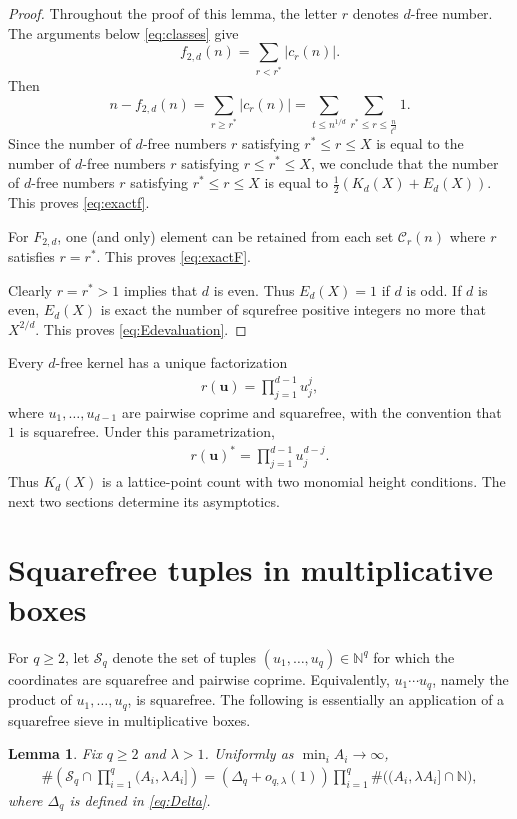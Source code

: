 \documentclass[12pt,a4paper,reqno]{amsart}
\numberwithin{equation}{section}
\newcommand{\N}{\mathbb N}
\newcommand{\cC}{\mathcal C}
\newcommand{\1}{\mathbf 1}
\newcommand{\bsu}{\boldsymbol u}
\theoremstyle{plain}
\newtheorem{lemma}[theorem]{Lemma}
\theoremstyle{definition}
\begin{document}
\begin{proof}Throughout the proof of this lemma, the letter $r$ denotes $d$-free number. The arguments below \eqref{eq:classes} give
$$f_{2,d}(n)=\sum_{r< r^\ast}|c_r(n)|.$$
Then 
$$n-f_{2,d}(n)=\sum_{r\geq r^\ast}|c_r(n)|=\sum_{t\leq n^{1/d}}\sum_{r^\ast\leq r\leq \frac{n}{t^d}}1.$$
Since the number of $d$-free numbers $r$ satisfying $r^\ast\leq r\leq X$ is equal to the number of $d$-free numbers $r$ satisfying $r\leq r^\ast\leq X$, we conclude that
the number of $d$-free numbers $r$ satisfying $r^\ast\leq r\leq X$ is equal to $\frac{1}{2}(K_d(X)+E_d(X))$. This proves \eqref{eq:exactf}.

For
$F_{2,d}$, one (and only) element can be retained from each set $ \cC_r(n)$ where $r$ satisfies $r=r^*$. This proves \eqref{eq:exactF}. 

Clearly $r=r^\ast>1$ implies that $d$ is even. Thus $E_d(X)=1$ if $d$ is odd.
If $d$ is even, $E_d(X)$ is exact the number of squrefree positive integers no more that $X^{2/d}$. This proves
\eqref{eq:Edevaluation}.
\end{proof}

Every $d$-free kernel has a unique factorization
\begin{align}
 r(\bsu)=\prod_{j=1}^{d-1}u_j^j,
\label{eq:factorization}
\end{align}
where $u_1,\ldots,u_{d-1}$ are pairwise coprime and squarefree, with
the convention that $1$ is squarefree.  Under this parametrization,
\begin{align}
 r(\bsu)^*=\prod_{j=1}^{d-1}u_j^{d-j}.
\label{eq:oppositefactorization}
\end{align}
Thus $K_d(X)$ is a lattice-point count with two monomial height
conditions.  The next two sections determine its asymptotics.

\section{Squarefree tuples in multiplicative boxes}

For $q\geq2$, let $\mathcal S_q$ denote the set of tuples
$(u_1,\ldots,u_q)\in\N^q$ for which the coordinates are squarefree and
pairwise coprime.  Equivalently, $u_1\cdots u_q$, namely the product of $u_1,\ldots,u_q$, is squarefree. The following is essentially an application of a squarefree sieve in multiplicative boxes. 

\begin{lemma}\label{lem:boxsieve}
Fix $q\geq2$ and $\lambda>1$.  Uniformly as
$\min_i A_i\to\infty$,
\begin{align*}
 \#\left(
 \mathcal S_q\cap\prod_{i=1}^q(A_i,\lambda A_i]
 \right)
 =\left(\Delta_q+o_{q,\lambda}(1)\right)
 \prod_{i=1}^q\#\bigl((A_i,\lambda A_i]\cap\N\bigr),
\end{align*}
where $\Delta_q$ is defined in \eqref{eq:Delta}.
\end{lemma}
\end{document}
